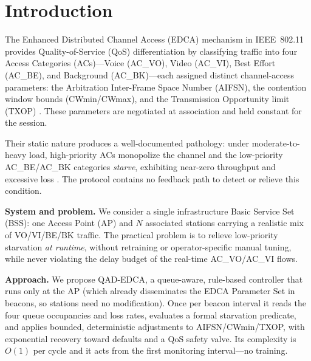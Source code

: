\documentclass[conference]{IEEEtran}
\newcommand{\AC}[1]{AC\_#1}
\begin{document}
\section{Introduction}
The Enhanced Distributed Channel Access (EDCA) mechanism in IEEE~802.11
provides Quality-of-Service (QoS) differentiation by classifying traffic into
four Access Categories (ACs)---Voice (\AC{VO}), Video (\AC{VI}), Best Effort
(\AC{BE}), and Background (\AC{BK})---each assigned distinct channel-access
parameters: the Arbitration Inter-Frame Space Number (AIFSN), the contention
window bounds (CWmin/CWmax), and the Transmission Opportunity limit (TXOP)
\cite{ieee80211}. These parameters are negotiated at association and held
constant for the session.

Their static nature produces a well-documented pathology: under
moderate-to-heavy load, high-priority ACs monopolize the channel and the
low-priority \AC{BE}/\AC{BK} categories \emph{starve}, exhibiting near-zero
throughput and excessive loss \cite{ugwu,mammeri}. The protocol contains no
feedback path to detect or relieve this condition.

\textbf{System and problem.} We consider a single infrastructure Basic
Service Set (BSS): one Access Point (AP) and $N$ associated stations carrying
a realistic mix of VO/VI/BE/BK traffic. The practical problem is to relieve
low-priority starvation \emph{at runtime}, without retraining or
operator-specific manual tuning, while never violating the delay budget of
the real-time \AC{VO}/\AC{VI} flows.

\textbf{Approach.} We propose QAD-EDCA, a queue-aware, rule-based controller
that runs only at the AP (which already disseminates the EDCA Parameter Set
in beacons, so stations need no modification). Once per beacon interval it
reads the four queue occupancies and loss rates, evaluates a formal
starvation predicate, and applies bounded, deterministic adjustments to
AIFSN/CWmin/TXOP, with exponential recovery toward defaults and a QoS safety
valve. Its complexity is $O(1)$ per cycle and it acts from the first
monitoring interval---no training.
\end{document}
